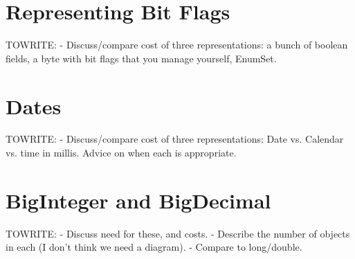 \section{Representing Bit Flags}
\label{sec:bit-flags}
TOWRITE:
- Discuss/compare cost of three representations: a bunch of boolean fields, a
byte with bit flags that you manage yourself, EnumSet.

\section{Dates}
TOWRITE:
- Discuss/compare cost of three representations: Date vs. Calendar vs. time in
millis.  Advice on when each is appropriate.

\section{BigInteger and BigDecimal}
TOWRITE:
- Discuss need for these, and costs.  - Describe the number of objects in each
(I don't think we need a diagram). - Compare to long/double.
